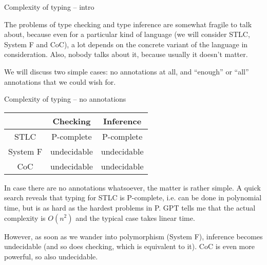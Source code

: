 \documentclass{beamer}
\begin{document}
\begin{frame}{Complexity of typing -- intro}

The problems of type checking and type inference are somewhat fragile to talk about, because even for a particular kind of language (we will consider STLC, System F and CoC), a lot depends on the concrete variant of the language in consideration. Also, nobody talks about it, because usually it doesn't matter.

\vspace{2em}

We will discuss two simple cases: no annotations at all, and ``enough'' or ``all'' annotations that we could wish for.

\end{frame}

\begin{frame}{Complexity of typing -- no annotations}

\begin{table}
  \centering
  \begin{tabular}{|c|c|c|}
    \hline
                   & Checking    & Inference   \\ \hline
    STLC           & P-complete  & P-complete  \\ \hline
    System F       & undecidable & undecidable \\ \hline
    CoC            & undecidable & undecidable \\ \hline
  \end{tabular}
\end{table}

\vspace{1em}

In case there are no annotations whatsoever, the matter is rather simple. A quick search reveals that typing for STLC is P-complete, i.e. can be done in polynomial time, but is as hard as the hardest problems in P. GPT tells me that the actual complexity is $O(n^2)$ and the typical case takes linear time.

\vspace{1em}

However, as soon as we wander into polymorphism (System F), inference becomes undecidable (and so does checking, which is equivalent to it). CoC is even more powerful, so also undecidable.

\end{frame}
\end{document}
